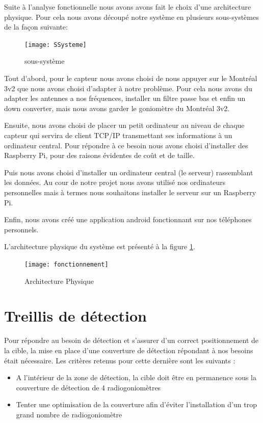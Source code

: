 Suite à l'analyse fonctionnelle nous avons avons fait le choix d'une architecture physique.
Pour cela nous avons découpé notre système en plusieurs sous-systèmes de la façon suivante:

\begin{figure}[h]
  \centering
  \texttt{[image: SSysteme]}
  \caption{sous-système}
\end{figure}

Tout d'abord, pour le capteur nous avons choisi de nous appuyer sur le Montréal 3v2 que nous avons choisi d'adapter à notre problème. Pour cela nous avons du adapter les antennes a nos fréquences, installer un filtre passe bas et enfin un down converter, mais nous avons garder le goniomètre du Montréal 3v2.

Ensuite, nous avons choisi de placer un petit ordinateur au niveau de chaque capteur qui servira de client TCP/IP transmettant ses informations à un ordinateur central. Pour répondre à ce besoin nous avons choisi d'installer des Raspberry Pi, pour des raisons évidentes de coût et de taille.

Puis nous avons choisi d'installer un ordinateur central (le serveur) rassemblant les données. Au cour de notre projet nous avons utilisé nos ordinateurs personnelles mais à termes nous souhaitons installer le serveur sur un Raspberry Pi.

Enfin, nous avons créé une application android fonctionnant sur nos téléphones personnels.


L'architecture physique du système est présenté à la figure \ref{fig:arch_phys}.

\begin{figure}[h]
  \centering
  \texttt{[image: fonctionnement]}
  \caption{Architecture Physique}
  \label{fig:arch_phys}
\end{figure}



\section{Treillis de détection}

Pour répondre au besoin de détection et s’assurer d’un correct positionnement de la cible, la mise en
place d’une couverture de détection répondant à nos besoins était nécessaire. Les critères retenus
pour cette dernière sont les suivants :

\begin{itemize}
\item A l’intérieur de la zone de détection, la cible doit être en permanence sous la couverture de détection de 4 radiogoniomètres
\item Tenter une optimisation de la couverture afin d’éviter l’installation d’un trop grand
nombre de radiogoniomètre
\end{itemize}

